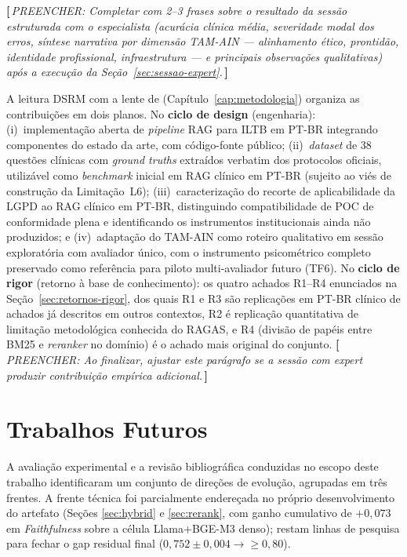 \documentclass[
  12pt,
  oneside,
  a4paper,
  english,
  brazil
]{abntex2}
\newcommand{\aluno}[1]{{\color{olive!80!black}\textbf{[\,}{\small\itshape PREENCHER: #1}\textbf{\,]}}}
\begin{document}
\aluno{Completar com 2--3 frases sobre o resultado da sessão
estruturada com o especialista (acurácia clínica média, severidade
modal dos erros, síntese narrativa por dimensão TAM-AIN ---
alinhamento ético, prontidão, identidade profissional, infraestrutura
--- e principais observações qualitativas) após a execução da
Seção~\ref{sec:sessao-expert}.}

A leitura DSRM com a lente de \citeauthor{hevner2007}
\cite{hevner2007} (Capítulo~\ref{cap:metodologia}) organiza as
contribuições em dois planos. No \textbf{ciclo de design} (engenharia):
(i)~implementação aberta de \emph{pipeline} RAG para ILTB em PT-BR
integrando componentes do estado da arte, com código-fonte público;
(ii)~\emph{dataset} de 38 questões clínicas com \emph{ground truths}
extraídos verbatim dos protocolos oficiais, utilizável como
\emph{benchmark} inicial em RAG clínico em PT-BR (sujeito ao viés de
construção da Limitação~L6); (iii)~caracterização do recorte de
aplicabilidade da LGPD ao RAG clínico em PT-BR, distinguindo
compatibilidade de POC de conformidade plena e identificando os
instrumentos institucionais ainda não produzidos; e (iv)~adaptação do
TAM-AIN como roteiro qualitativo em sessão exploratória com avaliador
único, com o instrumento psicométrico completo preservado como
referência para piloto multi-avaliador futuro (TF6). No \textbf{ciclo
de rigor} (retorno à base de conhecimento): os quatro achados R1--R4
enunciados na Seção~\ref{sec:retornos-rigor}, dos quais R1 e R3
são replicações em PT-BR clínico de achados já descritos em outros
contextos, R2 é replicação quantitativa de limitação metodológica
conhecida do RAGAS, e R4 (divisão de papéis entre BM25 e
\emph{reranker} no domínio) é o achado mais original do conjunto.
\aluno{Ao finalizar, ajustar este parágrafo se a sessão com expert
produzir contribuição empírica adicional.}

\section{Trabalhos Futuros}
\label{sec:trabalhos-futuros}

A avaliação experimental e a revisão bibliográfica conduzidas no escopo deste
trabalho identificaram um conjunto de direções de evolução, agrupadas em
três frentes. A frente técnica foi parcialmente endereçada no próprio
desenvolvimento do artefato (Seções \ref{sec:hybrid} e \ref{sec:rerank}, com
ganho cumulativo de $+0{,}073$ em \textit{Faithfulness} sobre a célula
Llama+BGE-M3 denso); restam linhas de pesquisa para fechar o gap residual final
($0{,}752 \pm 0{,}004 \to \geq 0{,}80$).
\end{document}
